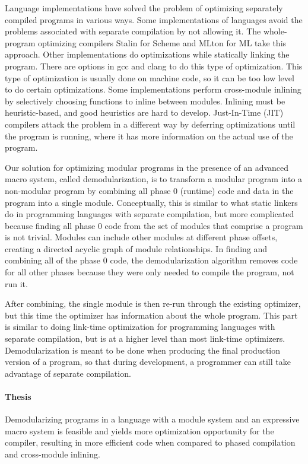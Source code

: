Language implementations have solved the problem of optimizing separately compiled programs in various ways.
Some implementations of languages avoid the problems associated with separate compilation by not allowing it. 
The whole-program optimizing compilers Stalin \cite{stalin} for Scheme and MLton \cite{mlton} for ML take this approach.
Other implementations do optimizations while statically linking the program.
There are options in gcc \cite{gcc} and clang \cite{clang} to do this type of optimization.
This type of optimization is usually done on machine code, so it can be too low level to do certain optimizations.
Some implementations perform cross-module inlining by selectively choosing functions to inline between modules.
Inlining must be heuristic-based, and good heuristics are hard to develop. 
Just-In-Time (JIT) compilers attack the problem in a different way by deferring optimizations until the program is running, where it has more information on the actual use of the program.

Our solution for optimizing modular programs in the presence of an advanced macro system, called demodularization, is to transform a modular program into a non-modular program by combining all phase 0 (runtime) code and data in the program into a single module.
Conceptually, this is similar to what static linkers do in programming languages with separate compilation, but more complicated because finding all phase 0 code from the set of modules that comprise a program is not trivial.
Modules can include other modules at different phase offsets, creating a directed acyclic graph of module relationships.
In finding and combining all of the phase 0 code, the demodularization algorithm removes code for all other phases because they were only needed to compile the program, not run it.

After combining, the single module is then re-run through the existing optimizer, but this time the optimizer has information about the whole program.
This part is similar to doing link-time optimization for programming languages with separate compilation, but is at a higher level than most link-time optimizers.
Demodularization is meant to be done when producing the final production version of a program, so that during development, a programmer can still take advantage of separate compilation.

\paragraph{Thesis} Demodularizing programs in a language with a module system and an expressive macro system is feasible and yields more optimization opportunity for the compiler, resulting in more efficient code when compared to phased compilation and cross-module inlining.

